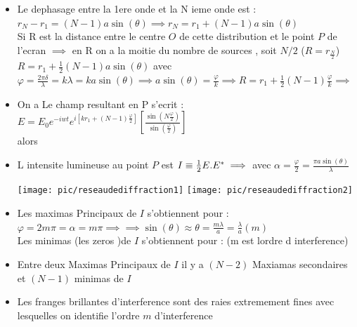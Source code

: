 \documentclass[12pt]{book}
\begin{document}
\begin{itemize}
                \item Le dephasage entre la 1ere onde et la N ieme onde est : \\
                    $r_N-r_1=(N-1)a\sin(\theta)\implies r_N=r_1+(N-1)a\sin(\theta)$ \\
                    Si R est la distance entre le centre $O$ de cette distribution et le point $P$ de l'ecran $\implies$ en R on a la moitie du nombre de sources , soit $N/2$ ($R=r_{\frac{N}{2}}$)\\
                    $R = r_1 + \frac{1}{2}(N-1)a\sin(\theta)$ avec $\varphi = \frac{2\pi\delta}{\lambda}=k\lambda=ka\sin(\theta)\implies a\sin(\theta) = \frac{\varphi}{k} \implies R = r_1 + \frac{1}{2}(N-1)\frac{\varphi}{k} \implies $ \\
                \item On a Le champ resultant en P s'ecrit : $E = E_0e^{-iwt}e^{i[kr_1+(N-1)\frac{\varphi}{2}]}\left[ \frac{\sin(N\frac{\varphi}{2})}{\sin(\frac{\varphi}{2})} \right]$ \\
                    alors 
                \item L intensite lumineuse au point $P$ est $I \equiv \frac{1}{2}E.E^{*} \\ \implies $ avec $\alpha = \frac{\varphi}{2}=\frac{\pi a \sin(\theta)}{\lambda} $
                    \begin{center}
                        \texttt{[image: pic/reseaudediffraction1]}
                        \texttt{[image: pic/reseaudediffraction2]}
                    \end{center}
                \item Les maximas Principaux de $I$ s'obtiennent pour :\\
                    $\varphi = 2m\pi=\alpha=m\pi\implies $$ \implies \sin(\theta) \approx \theta =\frac{m\lambda}{a}=\frac{\lambda}{a}(m)$\\
                    Les minimas (les zeros )de $I$ s'obtiennent pour :  (m est lordre d interference)
                \item Entre deux Maximas Principaux de $I$ il y a $(N-2)$ Maxiamas secondaires et $(N-1)$ minimas de $I$
                \item Les franges brillantes d'interference sont des raies extremement fines avec lesquelles on identifie l'ordre $m$ d'interference

\end{itemize}
\end{document}
